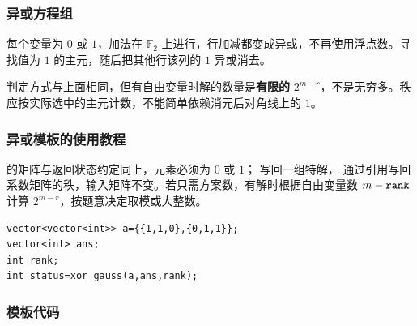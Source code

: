 \subsubsection*{异或方程组}
每个变量为 $0$ 或 $1$，加法在 $\mathbb F_2$ 上进行，行加减都变成异或，不再使用浮点数。寻找值为 $1$ 的主元，随后把其他行该列的 $1$ 异或消去。

判定方式与上面相同，但有自由变量时解的数量是\textbf{有限的} $2^{m-r}$，不是无穷多。秩应按实际选中的主元计数，不能简单依赖消元后对角线上的 $1$。

\subsubsection*{异或模板的使用教程}
 的矩阵与返回状态约定同上，元素必须为 $0$ 或 $1$； 写回一组特解， 通过引用写回系数矩阵的秩，输入矩阵不变。若只需方案数，有解时根据自由变量数 $m-\InlineCode{rank}$ 计算 $2^{m-r}$，按题意决定取模或大整数。
\begin{lstlisting}[style=mtycpp,numbers=none]
vector<vector<int>> a={{1,1,0},{0,1,1}};
vector<int> ans;
int rank;
int status=xor_gauss(a,ans,rank);
\end{lstlisting}

\subsubsection*{模板代码}
